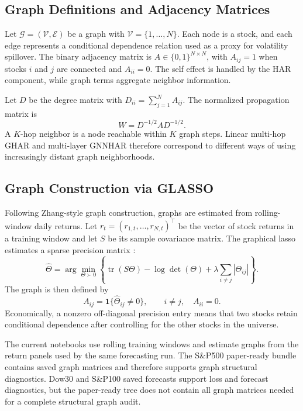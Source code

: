 \documentclass[11pt,a4paper]{article}
\begin{document}
\subsection{Graph Definitions and Adjacency Matrices}
\label{subsec:graph}

Let \(\mathcal{G}=(\mathcal{V},\mathcal{E})\) be a graph with \(\mathcal{V}=\{1,\ldots,N\}\).  Each node is a stock, and each edge represents a conditional dependence relation used as a proxy for volatility spillover.  The binary adjacency matrix is \(A\in\{0,1\}^{N\times N}\), with \(A_{ij}=1\) when stocks \(i\) and \(j\) are connected and \(A_{ii}=0\).  The self effect is handled by the HAR component, while graph terms aggregate neighbor information.

Let \(D\) be the degree matrix with \(D_{ii}=\sum_{j=1}^N A_{ij}\).  The normalized propagation matrix is
\[
W=D^{-1/2}AD^{-1/2}.
\]
A \(K\)-hop neighbor is a node reachable within \(K\) graph steps.  Linear multi-hop GHAR and multi-layer GNNHAR therefore correspond to different ways of using increasingly distant graph neighborhoods.

\subsection{Graph Construction via GLASSO}
\label{subsec:glasso}

Following Zhang-style graph construction, graphs are estimated from rolling-window daily returns.  Let \(r_t=(r_{1,t},\ldots,r_{N,t})^\top\) be the vector of stock returns in a training window and let \(S\) be its sample covariance matrix.  The graphical lasso estimates a sparse precision matrix \citep{friedman2008glasso}:
\[
\widehat{\Theta}
=
\arg\min_{\Theta\succ0}
\left\{
\operatorname{tr}(S\Theta)-\log\det(\Theta)
+\lambda \sum_{i\neq j}|\Theta_{ij}|
\right\}.
\]
The graph is then defined by
\[
A_{ij}
=
\mathbf{1}\{\widehat{\Theta}_{ij}\neq 0\},\qquad i\neq j,
\quad A_{ii}=0.
\]
Economically, a nonzero off-diagonal precision entry means that two stocks retain conditional dependence after controlling for the other stocks in the universe.

The current notebooks use rolling training windows and estimate graphs from the return panels used by the same forecasting run.  The S\&P500 paper-ready bundle contains saved graph matrices and therefore supports graph structural diagnostics.  Dow30 and S\&P100 saved forecasts support loss and forecast diagnostics, but the paper-ready tree does not contain all graph matrices needed for a complete structural graph audit.
\end{document}
